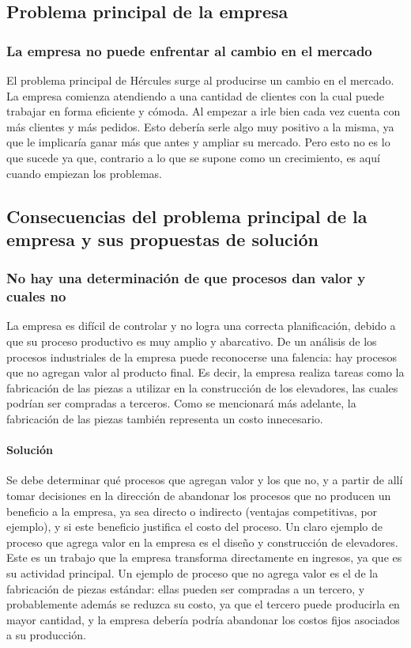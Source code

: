 \subsection{Problema principal de la empresa}
\subsubsection{La empresa no puede enfrentar al cambio en el mercado}
El problema principal de H\'ercules surge al producirse un cambio en el mercado. La empresa comienza atendiendo a una cantidad de clientes con la cual puede trabajar en forma eficiente y c\'omoda. Al empezar a irle bien cada vez cuenta con m\'as clientes y m\'as pedidos. Esto deber\'ia serle algo muy positivo a la misma, ya que le implicar\'ia ganar m\'as que antes y ampliar su mercado. Pero esto no es lo que sucede ya que, contrario a lo que se supone como un crecimiento, es aqu\'i cuando empiezan los problemas.\\

\subsection{Consecuencias del problema principal de la empresa y sus propuestas de soluci\'on}

\subsubsection{No hay una determinaci\'on de que procesos dan valor y cuales no}
La empresa es dif\'icil de controlar y no logra una correcta planificaci\'on, debido a que su proceso productivo es muy amplio y abarcativo. De un an\'alisis de los procesos industriales de la empresa puede reconocerse una falencia: hay procesos que no agregan valor al producto final. Es decir, la empresa realiza tareas como la fabricaci\'on de las piezas a utilizar en la construcci\'on de los elevadores, las cuales podr\'ian ser compradas a terceros. Como se mencionar\'a m\'as adelante, la fabricaci\'on de las piezas tambi\'en representa un costo innecesario.
\paragraph{Soluci\'on}
Se debe determinar qu\'e procesos que agregan valor y los que no, y a partir de all\'i tomar decisiones en la direcci\'on de abandonar los procesos que no producen un beneficio a la empresa, ya sea directo o indirecto (ventajas competitivas, por ejemplo), y si este beneficio justifica el costo del proceso. Un claro ejemplo de proceso que agrega valor en la empresa es el dise\~no y construcci\'on de elevadores. Este es un trabajo que la empresa transforma directamente en ingresos, ya que es su actividad principal. Un ejemplo de proceso que no agrega valor es el de la fabricaci\'on de piezas est\'andar: ellas pueden ser compradas a un tercero, y probablemente adem\'as se reduzca su costo, ya que el tercero puede producirla en mayor cantidad, y la empresa deber\'ia podr\'ia abandonar los costos fijos asociados a su producci\'on.

